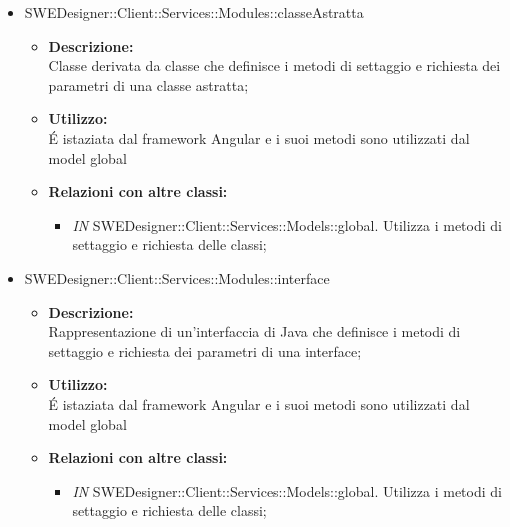 \begin{itemize}
\begin{itemize}
		\item SWEDesigner::Client::Services::Modules::classeAstratta
		\begin{itemize}
			\item \textbf{Descrizione:}\\
			Classe derivata da classe che definisce i metodi di settaggio e richiesta dei parametri di una classe astratta;
			\item \textbf{Utilizzo:}\\
			É istaziata dal framework Angular e i suoi metodi sono utilizzati dal model global
			\item \textbf{Relazioni con altre classi: }
			\begin{itemize}
			\item \emph{IN} SWEDesigner::Client::Services::Models::global. Utilizza i metodi di settaggio e richiesta delle classi;
			\end{itemize}
		\end{itemize}
		
		
		\item SWEDesigner::Client::Services::Modules::interface
		\begin{itemize}
			\item \textbf{Descrizione:}\\
			Rappresentazione di un'interfaccia di Java che definisce i metodi di settaggio e richiesta dei parametri di una interface;
			\item \textbf{Utilizzo:}\\
			É istaziata dal framework Angular e i suoi metodi sono utilizzati dal model global
			\item \textbf{Relazioni con altre classi: }
			\begin{itemize}
			\item \emph{IN} SWEDesigner::Client::Services::Models::global. Utilizza i metodi di settaggio e richiesta delle classi;
			\end{itemize}
		\end{itemize}
		
		
		\end{itemize}
				\end{itemize}




